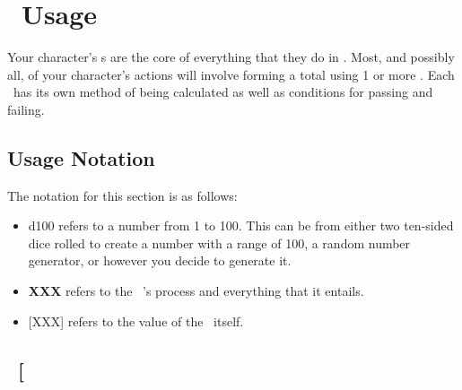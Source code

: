 \section{\attribute\ Usage}\label{sec:attr_usage}
Your character's \attribute s are the core of everything that they do in \gametitle. Most, and possibly all, of your character's actions will involve forming a total using 1 or more \attribute . Each \attribute\ has its own method of being calculated as well as conditions for passing and failing. 

\subsection*{Usage Notation}\label{subsec:notation}
The notation for this section is as follows:
\begin{itemize}
	\item d100 refers to a number from 1 to 100. This can be from either two ten-sided dice rolled to create a number with a range of 100, a random number generator, or however you decide to generate it.
	\item \textbf{XXX} refers to the \attribute\ 's process and everything that it entails.
	\item {[}XXX{]} refers to the value of the \attribute\ itself.
\end{itemize}
\clearpage

\subsection{\KNOWful\ {[}\KNOW\index{\attribute!\KNOWful}{]}}\label{subsec:kno}
\clearpage

